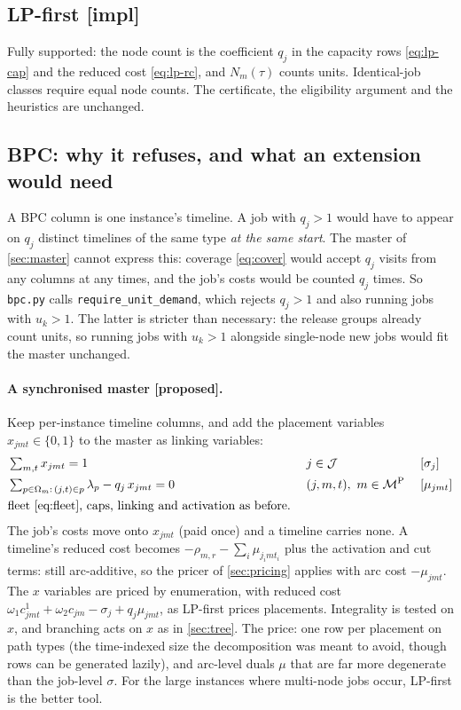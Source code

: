 \documentclass[11pt,a4paper]{article}
\theoremstyle{definition}
\theoremstyle{remark}
\newcommand{\J}{\mathcal{J}}
\newcommand{\M}{\mathcal{M}}
\newcommand{\MP}{\M^{\mathrm{P}}}
\newcommand{\Om}{\Omega}
\newcommand{\code}[1]{\texttt{#1}}
\newcommand{\status}[1]{\textsf{\small[#1]}}
\begin{document}
\subsection{LP-first \status{impl}}
Fully supported: the node count is the coefficient $q_j$ in the capacity rows
\eqref{eq:lp-cap} and the reduced cost \eqref{eq:lp-rc}, and $N_m(\tau)$ counts
units. Identical-job classes require equal node counts. The certificate, the
eligibility argument and the heuristics are unchanged.

\subsection{BPC: why it refuses, and what an extension would need}
A BPC column is one instance's timeline. A job with $q_j>1$ would have to appear
on $q_j$ distinct timelines of the same type \emph{at the same start}. The
master of \cref{sec:master} cannot express this: coverage \eqref{eq:cover} would
accept $q_j$ visits from any columns at any times, and the job's costs would be
counted $q_j$ times. So \code{bpc.py} calls \code{require\_unit\_demand}, which
rejects $q_j>1$ and also running jobs with $u_k>1$. The latter is stricter than
necessary: the release groups already count units, so running jobs with
$u_k>1$ alongside single-node new jobs would fit the master unchanged.

\paragraph{A synchronised master \status{proposed}.} Keep per-instance timeline
columns, and add the placement variables $x_{jmt}\in\{0,1\}$ to the master as
linking variables:
\begin{alignat*}{3}
&\textstyle\sum_{m,t}x_{jmt}=1 &\;& j\in\J &\;& [\sigma_j]\\
&\textstyle\sum_{p\in\Om_m:\,(j,t)\in p}\lambda_p-q_j\,x_{jmt}=0 && (j,m,t),\ m\in\MP && [\mu_{jmt}]\\
&\text{fleet \eqref{eq:fleet}, caps, linking and activation as before.}
\end{alignat*}
The job's costs move onto $x_{jmt}$ (paid once) and a timeline carries none.
A timeline's reduced cost becomes $-\rho_{m,r}-\sum_i\mu_{j_imt_i}$ plus the
activation and cut terms: still arc-additive, so the pricer of
\cref{sec:pricing} applies with arc cost $-\mu_{jmt}$. The $x$ variables are
priced by enumeration, with reduced cost
$\omega_1c^1_{jmt}+\omega_2c_{jm}-\sigma_j+q_j\mu_{jmt}$, as LP-first prices
placements. Integrality is tested on $x$, and branching acts on $x$ as in
\cref{sec:tree}. The price: one row per placement on path types (the
time-indexed size the decomposition was meant to avoid, though rows can be
generated lazily), and arc-level duals $\mu$ that are far more degenerate than
the job-level $\sigma$. For the large instances where multi-node jobs occur,
LP-first is the better tool.
\end{document}
